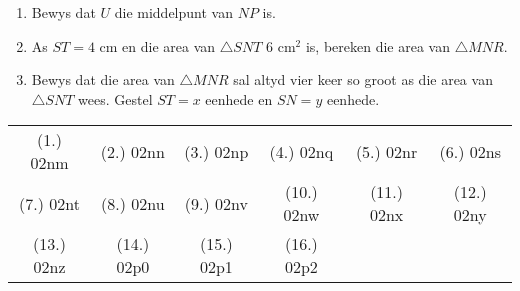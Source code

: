 \begin{eocexercises}{}
\begin{enumerate}[itemsep=20pt, label=\textbf{\arabic*}.]
\begin{center}
{}
\end{center}
\begin{enumerate}[noitemsep, label=\textbf{(\alph*)} ]
\item Bewys dat $U$ die middelpunt van $NP$ is.
\item As $ST=4$ cm en die area van $\triangle SNT$ $6$ cm$^2$ is, bereken die area van $\triangle MNR$.
\item Bewys dat die area van $\triangle MNR$ sal altyd vier keer so groot as die area van $\triangle SNT$ wees. Gestel $ST=x$ eenhede en $SN=y$ eenhede.
\end{enumerate}
\end{enumerate}

\par \practiceinfo
\par \begin{tabular}[h]{cccccc}
(1.)	02nm	&
(2.)	02nn	&
(3.)	02np	&
(4.)	02nq	&
(5.)	02nr	&
(6.)	02ns	\\ %
(7.)	02nt	&
(8.)	02nu	&
(9.)	02nv	&
(10.)	02nw	&
(11.)	02nx	&
(12.)	02ny	\\ %
(13.)	02nz	&
(14.)	02p0	&
(15.)	02p1	&
(16.)	02p2	&
\end{tabular}
\end{eocexercises}
